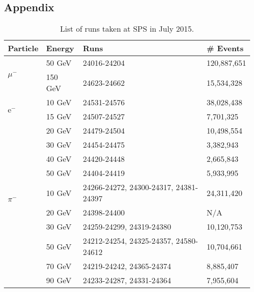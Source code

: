 \documentclass[a4paper, 11pt]{article}
\begin{document}





\clearpage

\begin{appendix}

	\section*{Appendix}

	\begin{table}[htb!]
		\centering
		\caption{List of runs taken at SPS in July 2015.}
		\label{table:dataruns}
		\begin{tabular}{@{}lp{2cm}p{7.5cm}p{2cm}@{}}
			\toprule
			\multicolumn{1}{l}{\textbf{Particle}} & \textbf{Energy} & \textbf{Runs} & \textbf{\# Events}\\
			\midrule
			\multirow{2}{*}{$\mu^-$}& 50 GeV & 24016-24204 & 120,887,651\\& 150 GeV & 24623-24662 & 15,534,328\\
			\midrule
			\multirow{2}{*}{e$^-$}& 10 GeV & 24531-24576 & 38,028,438\\& 15 GeV & 24507-24527 & 7,701,325\\& 20 GeV & 24479-24504 & 10,498,554\\& 30 GeV & 24454-24475 & 3,382,943\\& 40 GeV & 24420-24448 & 2,665,843\\& 50 GeV & 24404-24419 & 5,933,995\\
			\midrule
			\multirow{2}{*}{$\pi^-$}& 10 GeV & 24266-24272, 24300-24317, 24381-24397 & 24,311,420\\& 20 GeV & 24398-24400 & N/A\\& 30 GeV & 24259-24299, 24319-24380 & 10,120,753\\& 50 GeV & 24212-24254, 24325-24357, 24580-24612 & 10,704,661\\& 70 GeV & 24219-24242, 24365-24374 & 8,885,407\\& 90 GeV & 24233-24287, 24331-24364 & 7,955,604\\
			\bottomrule
		\end{tabular}
	\end{table}


\end{appendix}
\end{document}
